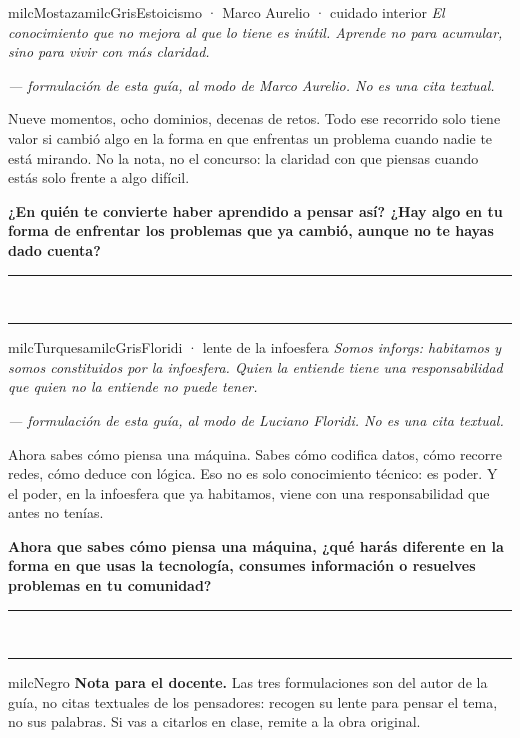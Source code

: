 \documentclass[11pt,letterpaper]{article}
\newcommand{\linead}[1]{\noindent\color{milcLinea}\rule{#1}{0.5pt}\color{milcNegro}}
\begin{document}
\begin{softbox}{milcMostaza}{milcGris}{Estoicismo · Marco Aurelio · cuidado interior}
\textit{El conocimiento que no mejora al que lo tiene es inútil. Aprende no para acumular, sino para vivir con más claridad.}

{\footnotesize\itshape\color{milcNegro!70}--- formulación de esta guía, al modo de Marco Aurelio. No es una cita textual.}

Nueve momentos, ocho dominios, decenas de retos. Todo ese recorrido solo tiene valor si cambió algo en la forma en que enfrentas un problema cuando nadie te está mirando. No la nota, no el concurso: la claridad con que piensas cuando estás solo frente a algo difícil.

\textbf{¿En quién te convierte haber aprendido a pensar así? ¿Hay algo en tu forma de enfrentar los problemas que ya cambió, aunque no te hayas dado cuenta?}
\end{softbox}
\linead{\linewidth}\\[1mm]
\linead{\linewidth}

\begin{softbox}{milcTurquesa}{milcGris}{Floridi · lente de la infoesfera}
\textit{Somos inforgs: habitamos y somos constituidos por la infoesfera. Quien la entiende tiene una responsabilidad que quien no la entiende no puede tener.}

{\footnotesize\itshape\color{milcNegro!70}--- formulación de esta guía, al modo de Luciano Floridi. No es una cita textual.}

Ahora sabes cómo piensa una máquina. Sabes cómo codifica datos, cómo recorre redes, cómo deduce con lógica. Eso no es solo conocimiento técnico: es poder. Y el poder, en la infoesfera que ya habitamos, viene con una responsabilidad que antes no tenías.

\textbf{Ahora que sabes cómo piensa una máquina, ¿qué harás diferente en la forma en que usas la tecnología, consumes información o resuelves problemas en tu comunidad?}
\end{softbox}
\linead{\linewidth}\\[1mm]
\linead{\linewidth}

\begin{infoband}{milcNegro}
\textbf{Nota para el docente.} Las tres formulaciones son del autor de la guía, no citas textuales de los pensadores: recogen su lente para pensar el tema, no sus palabras. Si vas a citarlos en clase, remite a la obra original.
\end{infoband}
\end{document}
